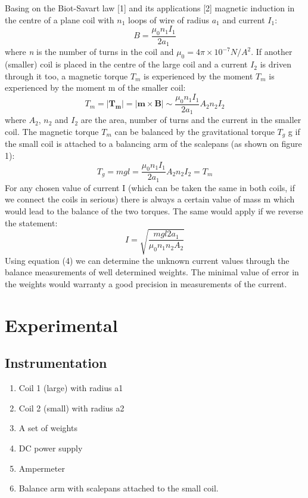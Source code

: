 \documentclass[twocolumn]{article}
\begin{document}
Basing on the Biot-Savart law [1] and its applications [2] magnetic induction in the centre of a plane coil with \textit{$n_1$} loops of wire of radius \textit{$a_1$} and current \textit{$I_1$}:
\begin{equation}
B = \frac{\mu_0 n_1 I_1}{2a_1}
\end{equation}
where \textit{n} is the number of turns in the coil and \textit{$\mu_0 = 4\pi \times 10^{-7}N / A^2$}. If another (smaller) coil is placed in the centre of the large coil and a current $I_2$ is driven through it too, a magnetic torque \textit{$T_m$} is experienced by the moment \textit{$T_m$} is experienced by the moment m of the smaller coil:
\begin{equation}
T_m = \left|\mathbf{T_m}\right| = \left|\mathbf{m \times B}\right| \sim \frac{\mu_0 n_1 I_1}{2a_1}A_2n_2I_2
\end{equation}
where $A_2$, $n_2$ and $I_2$ are the area, number of turns and the current in the smaller coil. The magnetic torque $T_m$ can be balanced by the gravitational torque $T_g$ g if the small coil is attached to a balancing arm of the scalepans (as shown on figure 1):
\begin{equation}
T_g = mgl = \frac{\mu_0 n_1 I_1}{2a_1}A_2n_2I_2 = T_m
\end{equation}
For any chosen value of current I (which can be taken the same in both coils, if we connect the
coils in serious) there is always a certain value of mass m which would lead to the balance of
the two torques. The same would apply if we reverse the statement:
\begin{equation}
I = \sqrt{\frac{mgl2a_1}{\mu_0n_1n_2A_2}}
\end{equation}
Using equation (4) we can determine the unknown current values through the balance
measurements of well determined weights. The minimal value of error in the weights would
warranty a good precision in measurements of the current.

\section{Experimental}
\subsection{Instrumentation}
\begin{enumerate} 
\setlength{\itemsep}{1pt}
\setlength{\parskip}{0pt}
\setlength{\parsep}{0pt}
\item Coil 1 (large) with radius a1
\item Coil 2 (small) with radius a2 
\item A set of weights
\item DC power supply
\item Ampermeter
\item Balance arm with scalepans attached to the small coil.
\end{enumerate}
\end{document}
